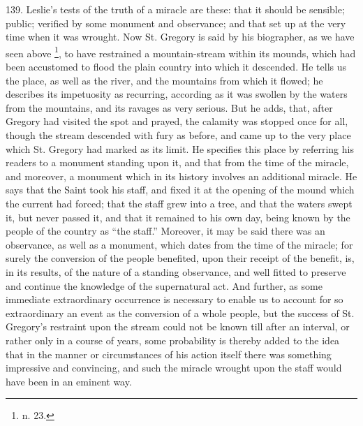 139.
Leslie's tests of the truth of a miracle are these: that it should be
sensible; public; verified by some monument and observance; and that
set up at the very time when it was wrought. Now St. Gregory is said
by his biographer, as we have seen above \footnote{n. 23.}, to have restrained a mountain-stream within its mounds, which
had been accustomed to flood the plain country into which it
descended. He tells us the place, as well as the river, and the
mountains from which it flowed; he describes its impetuosity as
recurring, according as it was swollen by the waters from the
mountains, and its ravages as very serious. But he adds, that, after
Gregory had visited the spot and prayed, the calamity was stopped once
for all, though the stream descended with fury as before, and came up
to the very place which St. Gregory had marked as its limit. He
specifies this place by referring his readers to a monument standing
upon it, and that from the time of the miracle, and moreover, a
monument which in its history involves an additional miracle. He says
that the Saint took his staff, and fixed it at the opening of the
mound which the current had forced; that the staff grew into a tree,
and that the waters swept it, but never passed it, and that it
remained to his own day, being known by the people of the country as ``the
staff.'' Moreover, it may be said there was an observance, as well as a
monument, which dates from the time of the miracle; for surely the
conversion of the people benefited, upon their receipt of the benefit,
is, in its results, of the nature of a standing observance, and well
fitted to preserve and continue the knowledge of the supernatural act.
And further, as some immediate extraordinary occurrence is necessary
to enable us to account for so extraordinary an event as the
conversion of a whole people, but the success of St. Gregory's
restraint upon the stream could not be known till after an interval,
or rather only in a course of years, some probability is thereby added
to the idea that in the manner or circumstances of his action itself
there was something impressive and convincing, and such the miracle
wrought upon the staff would have been in an eminent way.

